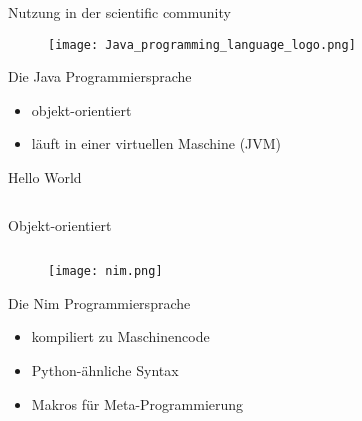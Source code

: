 \documentclass[aspectratio=169]{beamer}
\begin{document}
\begin{frame}{Nutzung in der scientific community}
\end{frame}

\begin{frame}{}
  \begin{figure}
    \centering
    \texttt{[image: Java\_programming\_language\_logo.png]}
    \caption{\cite{java_logo}}
    \label{fig:java_logo}
  \end{figure}
\end{frame}

\begin{frame}{Die Java Programmiersprache}
  \begin{itemize}
  \item objekt-orientiert
  \item läuft in einer virtuellen Maschine (JVM)
  \end{itemize}
\end{frame}

\begin{frame}{Hello World}
  \inputminted[linenos]{java}{examples/HelloWorld.java}
\end{frame}

\begin{frame}{Objekt-orientiert}
  \inputminted[linenos,fontsize=\scriptsize]{java}{examples/Inheritance.java}
\end{frame}

\begin{frame}{}
  \begin{figure}
    \centering
    \texttt{[image: nim.png]}
    \caption{\cite{nim_logo}}
    \label{fig:nim_logo}
  \end{figure}
\end{frame}

\begin{frame}{Die Nim Programmiersprache}
  \begin{itemize}
  \item kompiliert zu Maschinencode
  \item Python-ähnliche Syntax
  \item Makros für Meta-Programmierung
  \end{itemize}
\end{frame}
\end{document}

